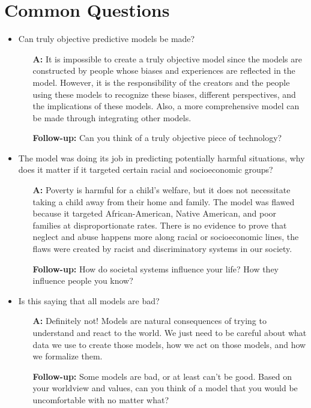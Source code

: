 \documentclass{article}
\begin{document}
\section{Common Questions}
    \begin{itemize}[\textbf{Q:}]
        \item Can truly objective predictive models be made?
        \begin{itemize}[]
            \item[\textbf{A:}] It is impossible to create a truly objective model since the models are constructed by people whose biases and experiences are reflected in the model. However, it is the responsibility of the creators and the people using these models to recognize these biases, different perspectives, and the implications of these models. Also, a more comprehensive model can be made through integrating other models.
            \item[\textbf{Follow-up:}] Can you think of a truly objective piece of technology?
        \end{itemize}
        \item The model was doing its job in predicting potentially harmful situations, why does it matter if it targeted certain racial and socioeconomic groups?
        \begin{itemize}[]
            \item[\textbf{A:}] Poverty is harmful for a child’s welfare, but it does not necessitate taking a child away from their home and family. The model was flawed because it targeted African-American, Native American, and poor families at disproportionate rates. There is no evidence to prove that neglect and abuse happens more along racial or socioeconomic lines, the flaws were created by racist and discriminatory systems in our society.
            \item[\textbf{Follow-up:}] How do societal systems influence your life? How they influence people you know?
        \end{itemize}
        \item Is this saying that all models are bad?
        \begin{itemize}[]
            \item[\textbf{A:}] Definitely not! Models are natural consequences of trying to understand and react to the world. We just need to be careful about what data we use to create those models, how we act on those models, and how we formalize them.
            \item[\textbf{Follow-up:}] Some models are bad, or at least can’t be good. Based on your worldview and values, can you think of a model that you would be uncomfortable with no matter what?
        \end{itemize}
    \end{itemize}
\end{document}
